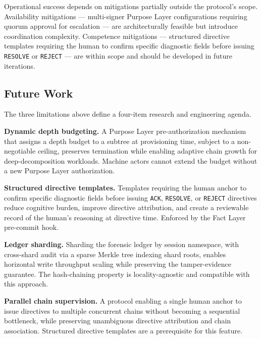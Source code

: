 Operational success depends on mitigations partially outside the protocol's scope. Availability mitigations — multi-signer Purpose Layer configurations requiring quorum approval for escalation — are architecturally feasible but introduce coordination complexity. Competence mitigations — structured directive templates requiring the human to confirm specific diagnostic fields before issuing \texttt{RESOLVE} or \texttt{REJECT} — are within scope and should be developed in future iterations.

\subsection{Future Work}
\label{sec:rs-future-work}

The three limitations above define a four-item research and engineering agenda.

\medskip
\noindent\textbf{Dynamic depth budgeting.} A Purpose Layer pre-authorization mechanism that assigns a depth budget to a subtree at provisioning time, subject to a non-negotiable ceiling, preserves termination while enabling adaptive chain growth for deep-decomposition workloads. Machine actors cannot extend the budget without a new Purpose Layer authorization.

\medskip
\noindent\textbf{Structured directive templates.} Templates requiring the human anchor to confirm specific diagnostic fields before issuing \texttt{ACK}, \texttt{RESOLVE}, or \texttt{REJECT} directives reduce cognitive burden, improve directive attribution, and create a reviewable record of the human's reasoning at directive time. Enforced by the Fact Layer pre-commit hook.

\medskip
\noindent\textbf{Ledger sharding.} Sharding the forensic ledger by session namespace, with cross-shard audit via a sparse Merkle tree indexing shard roots, enables horizontal write throughput scaling while preserving the tamper-evidence guarantee. The hash-chaining property is locality-agnostic and compatible with this approach.

\medskip
\noindent\textbf{Parallel chain supervision.} A protocol enabling a single human anchor to issue directives to multiple concurrent chains without becoming a sequential bottleneck, while preserving unambiguous directive attribution and chain association. Structured directive templates are a prerequisite for this feature.


